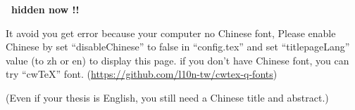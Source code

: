 \documentclass[class=NCU_thesis, crop=false]{standalone}
\begin{document}
\ifx\undefined\thispage\def\thispage{}\fi
\fontsize{16}{25}\selectfont
\sffamily %
\begin{titlepage}
    \vspace*{30mm}
    \begin{center}
        {\Huge\textbf{\thispage\ hidden now !!}\par}
    \end{center}
    \vspace*{30mm}
    {\LARGE 
    It avoid you get error because your computer no Chinese font, 
    Please enable Chinese by set \mbox{``disableChinese''} to false in \mbox{``config.tex''} and  set \mbox{``titlepageLang''} value (to zh or en) to display this page.
    if you don't have Chinese font, you can try \mbox{``cwTeX''} font. 
    (\url{https://github.com/l10n-tw/cwtex-q-fonts})\par
    (Even if your thesis is English, you still need a Chinese title and abstract.)\par}
    \vfill
\end{titlepage}
\restoregeometry
\rmfamily %
\cleardoublepage
\end{document}
